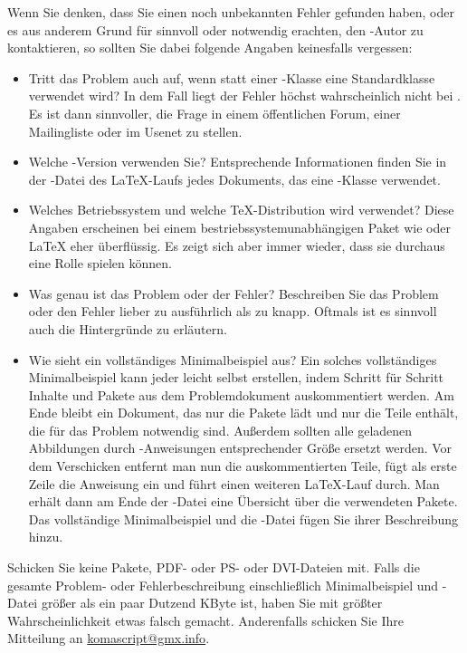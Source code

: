 {  Wenn Sie denken, dass Sie einen noch unbekannten Fehler gefunden haben, oder
  es aus anderem Grund für sinnvoll oder notwendig erachten, den
  \KOMAScript-Autor zu kontaktieren, so sollten Sie dabei folgende Angaben
  keinesfalls vergessen:
  \begin{itemize}
  \item Tritt das Problem auch auf, wenn statt einer \KOMAScript-Klasse eine
    Standardklasse verwendet wird? In dem Fall liegt der Fehler höchst
    wahrscheinlich nicht bei \KOMAScript. Es ist dann sinnvoller, die Frage in
    einem öffentlichen Forum, einer Mailingliste oder im Usenet zu stellen.
  \item Welche \KOMAScript-Version verwenden Sie? Entsprechende Informationen
    finden Sie in der -Datei des \LaTeX-Laufs jedes Dokuments, das
    eine \KOMAScript-Klasse verwendet.
  \item Welches Betriebssystem und welche \TeX-Distribution wird verwendet?
    Diese Angaben erscheinen bei einem bestriebssystemunabhängigen Paket wie
    \KOMAScript{} oder \LaTeX{} eher überflüssig. Es zeigt sich aber immer
    wieder, dass sie durchaus eine Rolle spielen können.
  \item Was genau ist das Problem oder der Fehler? Beschreiben Sie das Problem
    oder den Fehler lieber zu ausführlich als zu knapp. Oftmals ist es
    sinnvoll auch die Hintergründe zu erläutern.
  \item Wie sieht ein vollständiges Minimalbeispiel aus? Ein solches
    vollständiges Minimalbeispiel kann jeder leicht selbst erstellen, indem
    Schritt für Schritt Inhalte und Pakete aus dem Problemdokument
    auskommentiert werden. Am Ende bleibt ein Dokument, das nur die Pakete
    lädt und nur die Teile enthält, die für das Problem notwendig
    sind. Außerdem sollten alle geladenen Abbildungen durch
    -Anweisungen entsprechender Größe ersetzt werden. Vor dem
    Verschicken entfernt man nun die auskommentierten Teile, fügt als erste
    Zeile die Anweisung  ein und führt einen weiteren
    \LaTeX-Lauf durch. Man erhält dann am Ende der -Datei eine
    Übersicht über die verwendeten Pakete. Das vollständige Minimalbeispiel
    und die -Datei fügen Sie ihrer Beschreibung hinzu.
  \end{itemize}
  Schicken Sie keine Pakete, PDF- oder PS- oder DVI-Dateien mit.  Falls die
  gesamte Problem- oder Fehlerbeschreibung einschließlich Minimalbeispiel und
  -Datei größer als ein paar Dutzend KByte ist, haben Sie mit
  größter Wahrscheinlichkeit etwas falsch gemacht. Anderenfalls schicken Sie
  Ihre Mitteilung an \href{mailto:komascript@gmx.info}{komascript@gmx.info}.

}
